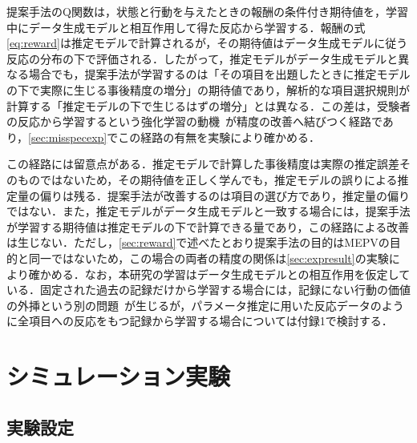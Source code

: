 \documentclass[paper]{ieicej}
\begin{document}
提案手法のQ関数は，状態と行動を与えたときの報酬の条件付き期待値を，学習中にデータ生成モデルと相互作用して得た反応から学習する．報酬の式\eqref{eq:reward}は推定モデルで計算されるが，その期待値はデータ生成モデルに従う反応の分布の下で評価される．したがって，推定モデルがデータ生成モデルと異なる場合でも，提案手法が学習するのは「その項目を出題したときに推定モデルの下で実際に生じる事後精度の増分」の期待値であり，解析的な項目選択規則が計算する「推定モデルの下で生じるはずの増分」とは異なる．この差は，受験者の反応から学習するという強化学習の動機~\cite{WangLiuXu2024}が精度の改善へ結びつく経路であり，\ref{sec:misspecexp}でこの経路の有無を実験により確かめる．

この経路には留意点がある．推定モデルで計算した事後精度は実際の推定誤差そのものではないため，その期待値を正しく学んでも，推定モデルの誤りによる推定量の偏りは残る．提案手法が改善するのは項目の選び方であり，推定量の偏りではない．また，推定モデルがデータ生成モデルと一致する場合には，提案手法が学習する期待値は推定モデルの下で計算できる量であり，この経路による改善は生じない．ただし，\ref{sec:reward}で述べたとおり提案手法の目的はMEPVの目的と同一ではないため，この場合の両者の精度の関係は\ref{sec:expresult}の実験により確かめる．なお，本研究の学習はデータ生成モデルとの相互作用を仮定している．固定された過去の記録だけから学習する場合には，記録にない行動の価値の外挿という別の問題~\cite{Fujimoto2019}が生じるが，パラメータ推定に用いた反応データのように全項目への反応をもつ記録から学習する場合については付録1で検討する．

\section{シミュレーション実験}\label{sec:exp}

\subsection{実験設定}\label{sec:expsetting}
\end{document}
